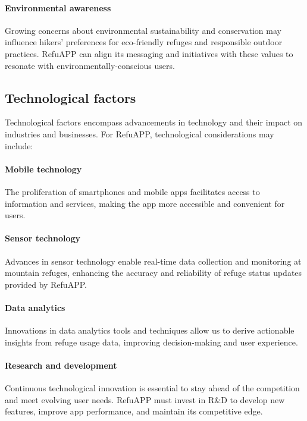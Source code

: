 \paragraph{Environmental awareness}
Growing concerns about environmental sustainability and conservation may influence hikers' preferences for eco-friendly refuges and responsible outdoor practices.
RefuAPP can align its messaging and initiatives with these values to resonate with environmentally-conscious users.

\subsection{Technological factors}\label{subsec:technological-factors}
Technological factors encompass advancements in technology and their impact on industries and businesses.
For RefuAPP, technological considerations may include:

\paragraph{Mobile technology}
The proliferation of smartphones and mobile apps facilitates access to information and services, making the app more accessible and convenient for users.

\paragraph{Sensor technology}
Advances in sensor technology enable real-time data collection and monitoring at mountain refuges, enhancing the accuracy and reliability of refuge status updates provided by RefuAPP.

\paragraph{Data analytics}
Innovations in data analytics tools and techniques allow us to derive actionable insights from refuge usage data, improving decision-making and user experience.

\paragraph{Research and development}
Continuous technological innovation is essential to stay ahead of the competition and meet evolving user needs.
RefuAPP must invest in R\&D to develop new features, improve app performance, and maintain its competitive edge.